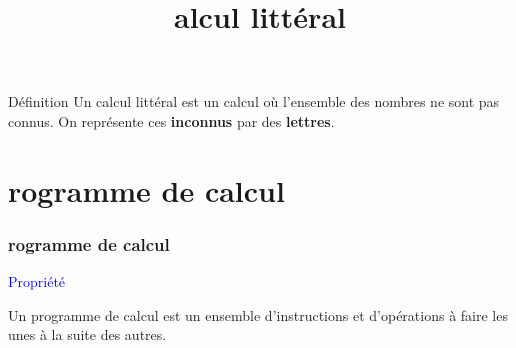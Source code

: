 \documentclass{beamer}
\title{\rmfamily{\textsc{C}}alcul littéral}
\begin{document}
\frame{\titlepage}

\begin{frame}
  \begin{alertblock}{Définition}
    Un calcul littéral est un calcul où l'ensemble des nombres ne sont pas connus. On représente ces \textbf{inconnus} par des \textbf{lettres}.
  \end{alertblock}
\end{frame}

\section{rogramme de calcul}

\begin{frame}
  \frametitle{rogramme de calcul}

  \begin{block}{\textcolor{blue}{Propriété}}

    \begin{multicols}{2}
      
      Un programme de calcul est un ensemble d'instructions et d'opérations à faire les unes à la suite des autres.\vspace{2cm}
      
    \end{multicols}
  \end{block}
\end{frame}
\end{document}
